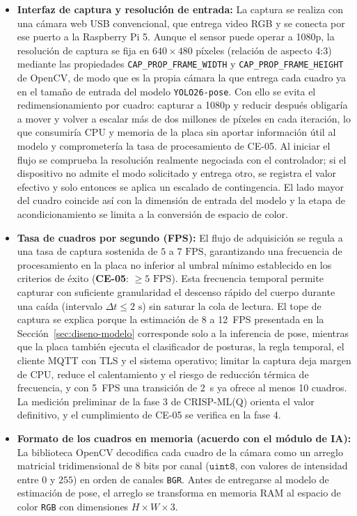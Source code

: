 \documentclass[12pt,a4paper,oneside]{book}
\theoremstyle{plain}
\theoremstyle{definition}
\theoremstyle{remark}
\begin{document}
\begin{itemize}
    \item \textbf{Interfaz de captura y resolución de entrada:} La captura se realiza con una cámara web USB convencional, que entrega video RGB y se conecta por ese puerto a la Raspberry Pi 5. Aunque el sensor puede operar a 1080p, la resolución de captura se fija en $640 \times 480$ píxeles (relación de aspecto 4:3) mediante las propiedades \texttt{CAP\_PROP\_FRAME\_WIDTH} y \texttt{CAP\_PROP\_FRAME\_HEIGHT} de OpenCV, de modo que es la propia cámara la que entrega cada cuadro ya en el tamaño de entrada del modelo \texttt{YOLO26-pose}. Con ello se evita el redimensionamiento por cuadro: capturar a 1080p y reducir después obligaría a mover y volver a escalar más de dos millones de píxeles en cada iteración, lo que consumiría CPU y memoria de la placa sin aportar información útil al modelo y comprometería la tasa de procesamiento de CE-05. Al iniciar el flujo se comprueba la resolución realmente negociada con el controlador; si el dispositivo no admite el modo solicitado y entrega otro, se registra el valor efectivo y solo entonces se aplica un escalado de contingencia. El lado mayor del cuadro coincide así con la dimensión de entrada del modelo y la etapa de acondicionamiento se limita a la conversión de espacio de color.
    \item \textbf{Tasa de cuadros por segundo (FPS):} El flujo de adquisición se regula a una tasa de captura sostenida de $5$ a $7\text{ FPS}$, garantizando una frecuencia de procesamiento en la placa no inferior al umbral mínimo establecido en los criterios de éxito (\textbf{CE-05}: $\geq 5\text{ FPS}$). Esta frecuencia temporal permite capturar con suficiente granularidad el descenso rápido del cuerpo durante una caída (intervalo $\Delta t \leq 2\text{ s}$) sin saturar la cola de lectura. El tope de captura se explica porque la estimación de 8 a 12~FPS presentada en la Sección~\ref{sec:diseno-modelo} corresponde solo a la inferencia de pose, mientras que la placa también ejecuta el clasificador de posturas, la regla temporal, el cliente MQTT con TLS y el sistema operativo; limitar la captura deja margen de CPU, reduce el calentamiento y el riesgo de reducción térmica de frecuencia, y con 5~FPS una transición de 2~s ya ofrece al menos 10 cuadros. La medición preliminar de la fase 3 de CRISP-ML(Q) orienta el valor definitivo, y el cumplimiento de CE-05 se verifica en la fase 4.
    \item \textbf{Formato de los cuadros en memoria (acuerdo con el módulo de IA):} La biblioteca OpenCV decodifica cada cuadro de la cámara como un arreglo matricial tridimensional de 8 bits por canal ($\texttt{uint8}$, con valores de intensidad entre $0$ y $255$) en orden de canales \texttt{BGR}. Antes de entregarse al modelo de estimación de pose, el arreglo se transforma en memoria RAM al espacio de color \texttt{RGB} con dimensiones $H \times W \times 3$.

\end{itemize}
\end{document}

